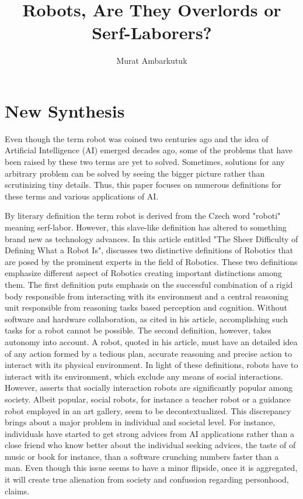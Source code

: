 \documentclass[man]{apa6}
\title{Robots, Are They Overlords or Serf-Laborers?}
\author{Murat Ambarkutuk}
\affiliation{English Language Institute, University of Delaware \\ murata@udel.edu}
\begin{document}
\maketitle
\section{New Synthesis}
Even though the term robot was coined two centuries ago and the idea of Artificial Intelligence (AI) emerged decades ago, some of the problems that have been raised by these two terms are yet to solved. Sometimes, solutions for any arbitrary problem can be solved by seeing the bigger picture rather than scrutinizing tiny details. Thus, this paper focuses on numerous definitions for these terms and various applications of AI.\par
By literary definition the term robot is derived from the Czech word "roboti" meaning serf-labor. However, this slave-like definition has altered to something brand new as technology advances. In this article entitled "The Sheer Difficulty of Defining What a Robot Is",  discusses two distinctive definitions of Robotics that are posed by the prominent experts in the field of Robotics. These two definitions emphasize different aspect of Robotics creating important distinctions among them. The first definition puts emphasis on the successful combination of a rigid body responsible from interacting with its environment and a central reasoning unit responsible from reasoning tasks based perception and cognition. Without software and hardware collaboration, as  cited in his article, accomplishing such tasks for a robot cannot be possible. The second definition, however, takes autonomy into account. A robot,  quoted in his article, must have an detailed idea of any action formed by a tedious plan, accurate reasoning and precise action to interact with its physical environment. In light of these definitions, robots have to interact with its environment, which exclude any means of social interactions. However,  asserts that socially interaction robots are significantly popular among society. Albeit popular, social robots, for instance a teacher robot or a guidance robot employed in an art gallery, seem to be decontextualized. This discrepancy brings about a major problem in individual and societal level. For instance, individuals have started to get strong advices from AI applications rather than a close friend who know better about the individual seeking advices, the taste of of music or book for instance, than a software crunching numbers faster than a man. Even though this issue seems to have a minor flipside, once it is aggregated, it will create true alienation from society and confussion regarding personhood,  claims.\par
\end{document}
